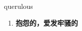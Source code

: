 
\begin{frame}
{\huge querulous}
\begin{center}
\begin{enumerate}\Large
  \item \textbf{抱怨的，爱发牢骚的}
\end{enumerate}
\end{center}
\end{frame}
